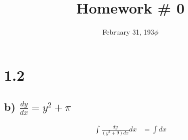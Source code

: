 \documentclass[11pt]{math-hw}
\title{Homework \# 0}
\date{February 31, 193$\phi$}
\begin{document}
\maketitle

\section*{1.2}

\subsection*{b) $\frac{dy}{dx} = y^2 + \pi$}

\begin{align*}
  \int \frac{dy}{(y^2+9)dx}dx &= \int dx\\
\end{align*}
\end{document}
